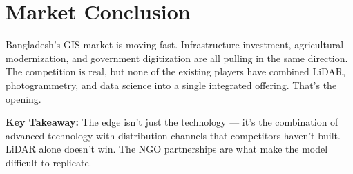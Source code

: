 \section{Market Conclusion}

Bangladesh's GIS market is moving fast. Infrastructure investment, agricultural modernization, and government digitization are all pulling in the same direction. The competition is real, but none of the existing players have combined LiDAR, photogrammetry, and data science into a single integrated offering. That's the opening.

\textcolor{SecondaryBlue}{\textbf{Key Takeaway:}} The edge isn't just the technology --- it's the combination of advanced technology with distribution channels that competitors haven't built. LiDAR alone doesn't win. The NGO partnerships are what make the model difficult to replicate.

